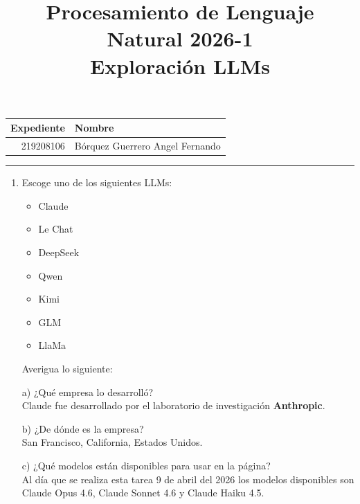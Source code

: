 \documentclass[a4paper, 11pt]{article}
\title
{
    Procesamiento de Lenguaje Natural 2026-1 \\
    Exploración LLMs
}
\newcommand{\Pspace}{0.5cm}
\newcommand{\Aspace}{0.2cm}
\begin{document}
    \maketitle

    \begin{center}
        \begin{tabular}{r|l}
            \textbf{Expediente} & \textbf{Nombre} \\ \hline
            219208106 & Bórquez Guerrero Angel Fernando \\
        \end{tabular}
    \end{center}

    \rule{\linewidth}{0.3mm}

    \vspace{0.3cm}
    \begin{enumerate}
        \vspace{\Pspace}
        \item Escoge uno de los siguientes LLMs:
        \begin{itemize}
            \item Claude
            \item Le Chat
            \item DeepSeek
            \item Qwen
            \item Kimi
            \item GLM
            \item LlaMa
        \end{itemize}
        Averigua lo siguiente:
            \vspace{\Aspace} \par
            a) ¿Qué empresa lo desarrolló?
            \\ { \color{azul} Claude fue desarrollado por el laboratorio de investigación \textbf{Anthropic}. \cite{ibmthink2024claudeai}}

            \vspace{\Aspace} \par
            b) ¿De dónde es la empresa?
            \\ { \color{azul} San Francisco, California, Estados Unidos. \cite{forbes2026anthropic} }

            \vspace{\Aspace} \par
            c) ¿Qué modelos están disponibles para usar en la página?
            \\ { \color{azul} Al día que se realiza esta tarea 9 de abril del 2026 los modelos disponibles son Claude Opus 4.6, Claude Sonnet 4.6 y Claude Haiku 4.5. \cite{claude2026models}}


\end{enumerate}
\end{document}
